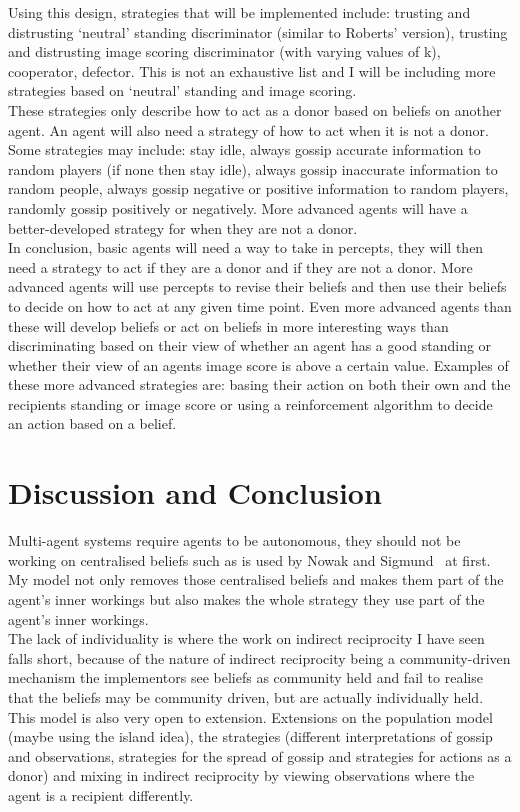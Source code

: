 \documentclass[twoside,twocolumn]{article}
\begin{document}
Using this design, strategies that will be implemented include: trusting and distrusting `neutral' standing discriminator (similar to Roberts' version), trusting and distrusting image scoring discriminator (with varying values of k), cooperator, defector. This is not an exhaustive list and I will be including more strategies based on `neutral' standing and image scoring.\\
These strategies only describe how to act as a donor based on beliefs on another agent. An agent will also need a strategy of how to act when it is not a donor. Some strategies may include: stay idle, always gossip accurate information to random players (if none then stay idle), always gossip inaccurate information to random people, always gossip negative or positive information to random players, randomly gossip positively or negatively. More advanced agents will have a better-developed strategy for when they are not a donor.\\
In conclusion, basic agents will need a way to take in percepts, they will then need a strategy to act if they are a donor and if they are not a donor. More advanced agents will use percepts to revise their beliefs and then use their beliefs to decide on how to act at any given time point. Even more advanced agents than these will develop beliefs or act on beliefs in more interesting ways than discriminating based on their view of whether an agent has a good standing or whether their view of an agents image score is above a certain value. Examples of these more advanced strategies are: basing their action on both their own and the recipients standing or image score or using a reinforcement algorithm to decide an action based on a belief.



\section{Discussion and Conclusion}
Multi-agent systems require agents to be autonomous, they should not be working on centralised beliefs such as is used by Nowak and Sigmund~\cite{evol_indirect_image} at first. My model not only removes those centralised beliefs and makes them part of the agent's inner workings but also makes the whole strategy they use part of the agent's inner workings. \\
The lack of individuality is where the work on indirect reciprocity I have seen falls short, because of the nature of indirect reciprocity being a community-driven mechanism the implementors see beliefs as community held and fail to realise that the beliefs may be community driven, but are actually individually held.\\
This model is also very open to extension. Extensions on the population model (maybe using the island idea), the strategies (different interpretations of gossip and observations, strategies for the spread of gossip and strategies for actions as a donor) and mixing in indirect reciprocity by viewing observations where the agent is a recipient differently.
\end{document}
